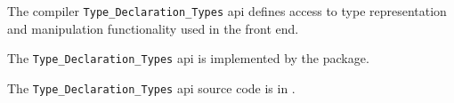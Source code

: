 
The compiler {\tt Type\_Declaration\_Types} api defines access to type representation and manipulation 
functionality used in the front end.

The {\tt Type\_Declaration\_Types} api is implemented by the  package.

The {\tt Type\_Declaration\_Types} api source code is in .

